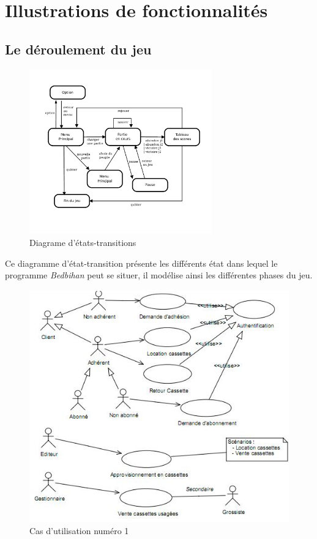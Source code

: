 \section{Illustrations de fonctionnalités }

	
	\subsection{Le déroulement du jeu}


		\begin{figure}
			\begin{center}
				\includegraphics[width=0.7\textwidth]{figure/etat_transition_partie.pdf}
			\end{center}
			\caption{Diagrame d'états-transitions}
			\label{fig:planif}
		\end{figure}
	
		Ce diagramme d'état-transition présente les différents état dans lequel le programme \emph{Bedbihan} peut se situer, il modélise ainsi les différentes phases du jeu.


		\begin{figure}
			\begin{center}
				\includegraphics[width=1\textwidth]{figure/cas_utilisation_1.png}
			\end{center}
			\caption{Cas d'utilisation numéro 1}
			\label{fig:use1}
		\end{figure}

